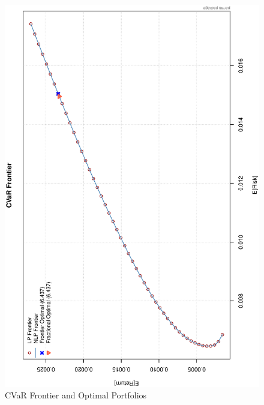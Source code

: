 \begin{landscape}
\begin{figure}[!ht]
\centering
\includegraphics[scale=0.7,angle=-90]{frontier.eps}
\caption[CVaR Frontier and Optimal Portfolios]{CVaR Frontier and Optimal Portfolios}\label{fig:frontier}
\end{figure} 
\end{landscape}